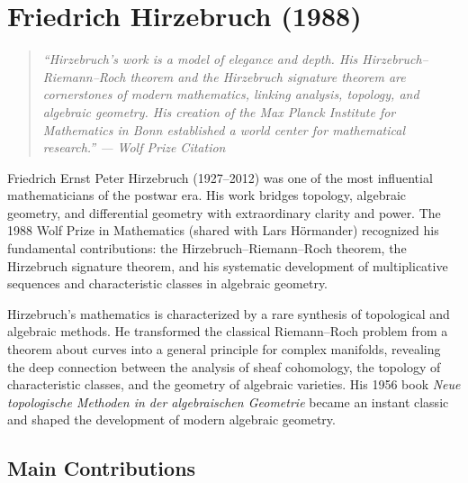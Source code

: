 \let\R\relax
\newcommand{\R}{\mathbb{R}}
\let\C\relax
\newcommand{\C}{\mathbb{C}}
\let\N\relax
\newcommand{\N}{\mathbb{N}}
\let\Z\relax
\newcommand{\Z}{\mathbb{Z}}
\let\Q\relax
\newcommand{\Q}{\mathbb{Q}}
\let\ch\relax
\newcommand{\ch}{\operatorname{ch}}
\let\Td\relax
\newcommand{\Td}{\operatorname{Td}}
\let\sign\relax
\newcommand{\sign}{\operatorname{sign}}
\let\cL\relax
\newcommand{\cL}{\mathcal{L}}

\chapter{Friedrich Hirzebruch (1988)}

\begin{quote}
\it ``Hirzebruch's work is a model of elegance and depth. His
Hirzebruch--Riemann--Roch theorem and the Hirzebruch signature theorem
are cornerstones of modern mathematics, linking analysis, topology, and
algebraic geometry. His creation of the Max Planck Institute for
Mathematics in Bonn established a world center for mathematical
research.'' --- Wolf Prize Citation
\end{quote}

Friedrich Ernst Peter Hirzebruch (1927--2012) was one of the most
influential mathematicians of the postwar era. His work bridges
topology, algebraic geometry, and differential geometry with
extraordinary clarity and power. The 1988 Wolf Prize in Mathematics
(shared with Lars H\"ormander) recognized his fundamental contributions:
the Hirzebruch--Riemann--Roch theorem, the Hirzebruch signature theorem,
and his systematic development of multiplicative sequences and
characteristic classes in algebraic geometry.

Hirzebruch's mathematics is characterized by a rare synthesis of
topological and algebraic methods. He transformed the classical
Riemann--Roch problem from a theorem about curves into a general
principle for complex manifolds, revealing the deep connection between
the analysis of sheaf cohomology, the topology of characteristic
classes, and the geometry of algebraic varieties. His 1956 book
\textit{Neue topologische Methoden in der algebraischen Geometrie}
became an instant classic and shaped the development of modern algebraic
geometry.

\section{Main Contributions}

